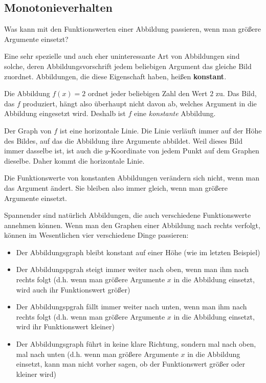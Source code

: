 \documentclass[../../main.tex]{subfiles}
\begin{document}
\subsection{Monotonieverhalten}
\label{sec:abbildungen_monotonie}

Was kann mit den Funktionswerten einer Abbildung passieren, wenn man größere Argumente einsetzt?

Eine sehr spezielle und auch eher uninteressante Art von Abbildungen sind solche, deren Abbildungsvorschrift jedem beliebigen Argument das gleiche Bild zuordnet. Abbildungen, die diese Eigenschaft haben, heißen \textbf{konstant}.

\begin{example}{}
    
    Die Abbildung $f(x)=2$ ordnet jeder beliebigen Zahl den Wert $2$ zu. Das Bild, das $f$ produziert, hängt also überhaupt nicht davon ab, welches Argument in die Abbildung eingesetzt wird. Deshalb ist $f$ eine \emph{konstante} Abbildung.
    
    Der Graph von $f$ ist eine horizontale Linie. Die Linie verläuft immer auf der Höhe des Bildes, auf das die Abbildung ihre Argumente abbildet. Weil dieses Bild immer dasselbe ist, ist auch die $y$-Koordinate von jedem Punkt auf dem Graphen dieselbe. Daher kommt die horizontale Linie.
\end{example}

Die Funktionswerte von konstanten Abbildungen verändern sich nicht, wenn man das Argument ändert. Sie bleiben also immer gleich, wenn man größere Argumente einsetzt.

Spannender sind natürlich Abbildungen, die auch verschiedene Funktionswerte annehmen können. Wenn man den Graphen einer Abbildung nach rechts verfolgt, können im Wesentlichen vier verschiedene Dinge passieren:
\begin{itemize}
    \item Der Abbildungsgraph bleibt konstant auf einer Höhe (wie im letzten Beispiel)
    \item Der Abbildungspgrah steigt immer weiter nach oben, wenn man ihm nach rechts folgt (d.h. wenn man größere Argumente $x$ in die Abbildung einsetzt, wird auch ihr Funktionswert größer)
    \item Der Abbildungspgrah fällt immer weiter nach unten, wenn man ihm nach rechts folgt (d.h. wenn man größere Argumente $x$ in die Abbildung einsetzt, wird ihr Funktionswert kleiner)
    \item Der Abbildungsgraph führt in keine klare Richtung, sondern mal nach oben, mal nach unten (d.h. wenn man größere Argumente $x$ in die Abbildung einsetzt, kann man nicht vorher sagen, ob der Funktionswert größer oder kleiner wird)
\end{itemize}
\end{document}
